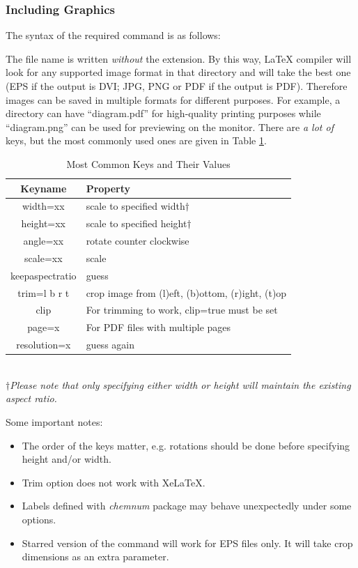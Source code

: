 \documentclass[10pt, a4paper]{article}
\begin{document}
\subsubsection{Including Graphics}
The syntax of the required command is as follows:
\begin{center}
\end{center}
The file name is written \emph{without} the extension. By this way, \LaTeX{} compiler will look for any supported image format in that directory and will take the best one (EPS if the output is DVI; JPG, PNG or PDF if the output is PDF). Therefore images can be saved in multiple formats for different purposes. For example, a directory can have ``diagram.pdf'' for high-quality printing purposes while ``diagram.png'' can be used for previewing on the monitor. There are \emph{a lot of} keys, but the most commonly used ones are given in Table \ref{graphicKeys}. 
\begin{table}[htbp]

\caption{Most Common Keys and Their Values\label{graphicKeys}}
\begin{tabular}{cl}
Keyname & Property \\ 
\hline 
width=xx & scale to specified width$\dagger$ \\ 
height=xx & scale to specified height$\dagger$ \\ 
angle=xx & rotate counter clockwise \\ 
scale=xx & scale \\
keepaspectratio & guess \\
trim=l b r t & crop image from (l)eft, (b)ottom, (r)ight, (t)op \\
clip & For trimming to work, clip=true must be set \\
page=x & For PDF files with multiple pages \\
resolution=x & guess again
\end{tabular} \\
\emph{$\dagger$Please note that only specifying either width or height will maintain the existing aspect ratio.}
\end{table}
Some important notes:
\begin{itemize}
\item The order of the keys matter, e.g. rotations should be done before specifying height and/or width.
\item Trim option does not work with Xe\LaTeX. 
\item Labels defined with \emph{chemnum} package may behave unexpectedly under some options. 
\item Starred version of the command will work for EPS files only. It will take crop dimensions as an extra parameter.
\end{itemize}
\end{document}
